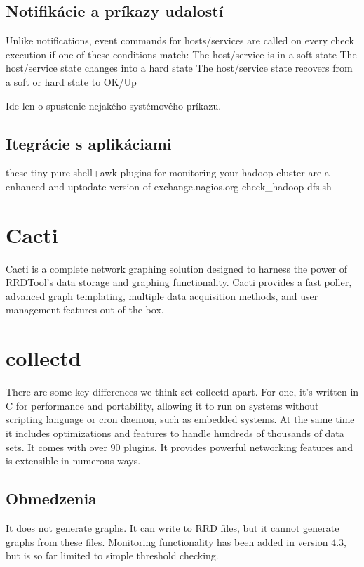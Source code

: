 \documentclass[11pt,final,oneside]{fithesis}
\begin{document}
\subsection{Notifikácie a príkazy udalostí}
Unlike notifications, event commands for hosts/services are called on every check execution if one of these conditions match:
The host/service is in a soft state
The host/service state changes into a hard state
The host/service state recovers from a soft or hard state to OK/Up

Ide len o spustenie nejakého systémového príkazu.
\cite{09}

\subsection{Itegrácie s aplikáciami} 
these tiny pure shell+awk plugins for monitoring your hadoop cluster are a enhanced and uptodate version of exchange.nagios.org check\_hadoop-dfs.sh
\cite{10}

\section{Cacti}
Cacti is a complete network graphing solution designed to harness the power of RRDTool's data storage and graphing functionality. Cacti provides a fast poller, advanced graph templating, multiple data acquisition methods, and user management features out of the box.
\cite{11}

\section{collectd}
There are some key differences we think set collectd apart. For one, it's written in C for performance and portability, allowing it to run on systems without scripting language or cron daemon, such as embedded systems. 
At the same time it includes optimizations and features to handle hundreds of thousands of data sets. It comes with over 90 plugins. It provides powerful networking features and is extensible in numerous ways. 

\subsection{Obmedzenia}
It does not generate graphs. It can write to RRD files, but it cannot generate graphs from these files. 
Monitoring functionality has been added in version 4.3, but is so far limited to simple threshold checking. 
\cite{12}
\end{document}
